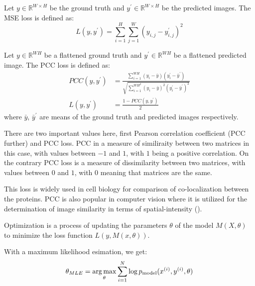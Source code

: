 \begin{definition}
	Let $y \in \mathbb{R}^{W \times H}$ be the ground truth and $y^\prime \in \mathbb{R}^{W \times H}$ be the predicted images. The MSE loss is defined as:
	\begin{equation}
		L(y, y^\prime) = \sum_{i=1}^{H} \sum_{j=1}^{W} (y_{i, j} - y_{i, j}^\prime)^2
	\end{equation}
\end{definition}

\begin{definition}
	\label{def:pcc-loss}
	Let $y \in \mathbb{R}^{WH}$ be a flattened ground truth and $y^\prime \in \mathbb{R}^{WH}$ be a flattened predicted image. The PCC loss is defined as:
	\begin{align}
		PCC(y, y^\prime) &= \frac{\sum_{i=1}^{{WH}}{(y_i - \bar{y})(y_i^\prime - \bar{y}^\prime)}}{\sqrt{\sum_{i=1}^{{WH}^2}{(y_i - \bar{y})^2(y_i^\prime - \bar{y}^\prime)^2}}}  \\
		L(y, y^\prime) &= \frac{1 - PCC(y, y^\prime)}{2}
	\end{align}
	where $\bar{y}$, $\bar{y}^\prime$ are means of the ground truth and predicted images respectively.
	
	There are two important values here, first Pearson correlation coefficient (PCC further) and PCC loss. PCC in a measure of similiraity between two matrices in this case, with values between $-1$ and $1$, with $1$ being a positive correlation. On the contrary PCC loss is a measure of dissimilarity between two matrices, with values between $0$ and $1$, with $0$ meaning that matrices are the same.

	This loss is widely used in cell biology for comparison of co-localization between the proteins. PCC is also popular in computer vision where it is utilized for the determination of image similarity in terms of spatial-intensity (\cite{Lachance_2020}).
\end{definition}

\begin{definition}[Optimization]
	Optimization is a process of updating the parameters $\theta$ of the model $M(X, \theta)$ to minimize the loss function $L(y, M(x, \theta))$.
\end{definition}

With a maximum likelihood esimation, we get:
\begin{equation}
	\theta_{MLE} = \operatorname*{arg\,max}\limits_{\theta} \sum_{i=1}^{N} \log{p_{\text{model}}(x^{(i)}, y^{(i)}, \theta)}
\end{equation}

